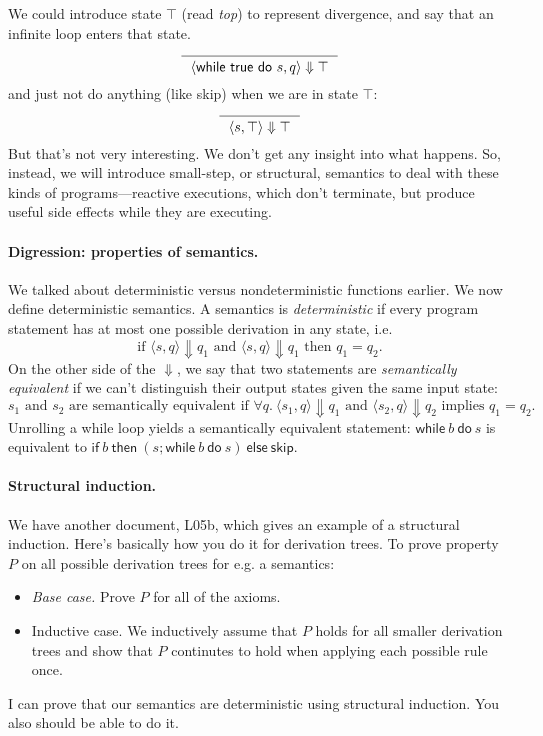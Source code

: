 \documentclass[11pt]{article}
\begin{document}
We could introduce state $\top$ (read \emph{top}) to represent divergence, and say that an infinite loop enters that state.
\[
\begin{prooftree}
  \infer0{~~\langle \mathsf{while} ~\mathsf{true}~ \mathsf{do} ~s,q\rangle \Downarrow \top~~}
\end{prooftree}
\]
and just not do anything (like \textsf{skip}) when we are in state $\top$:
\[
\begin{prooftree}
  \infer0{~~\langle s, \top \rangle \Downarrow \top~~}
\end{prooftree}
\]
But that's not very interesting. We don't get any insight into what happens.
So, instead, we will introduce small-step, or structural, semantics to deal
with these kinds of programs---reactive executions, which don't terminate,
but produce useful side effects while they are executing.

\paragraph{Digression: properties of semantics.} We talked about deterministic versus nondeterministic functions earlier. We now define deterministic semantics. A semantics is \emph{deterministic} if every program statement has at most one possible derivation in any state, i.e.
\[ \mbox{if } \langle s, q \rangle \Downarrow q_1 \mbox{ and } \langle s, q \rangle \Downarrow q_1 \mbox{ then } q_1 = q_2. \]
On the other side of the $\Downarrow$, we say that two statements are \emph{semantically equivalent} if we can't distinguish their output states given the same input state:
\[ s_1 \mbox{ and } s_2 \mbox{ are semantically equivalent if } \forall q.~ \langle s_1, q \rangle \Downarrow q_1 \mbox{ and } \langle s_2, q \rangle \Downarrow q_2 \mbox{ implies } q_1 = q_2. \]
Unrolling a while loop yields a semantically equivalent statement: $\mathsf{while} ~b~ \mathsf{do} ~s$ is equivalent to $\mathsf{if } ~b~ \mathsf{then~} (s; \mathsf{while} ~b~ \mathsf{do} ~s)~ \mathsf{else~skip}$.

\paragraph{Structural induction.} We have another document, L05b, which gives an example of a structural induction. Here's basically how you do it for derivation trees. To prove property $P$ on all possible derivation trees for e.g. a semantics:
\begin{itemize}[noitemsep]
\item \emph{Base case.} Prove $P$ for all of the axioms.
\item {Inductive case.} We inductively assume that $P$ holds for all smaller derivation trees and show that $P$ continutes to hold when applying each possible rule once.
\end{itemize}
I can prove that our semantics are deterministic using structural induction.
You also should be able to do it.
\end{document}
